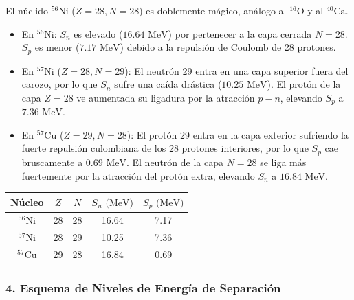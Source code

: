 \begin{problema}
El núclido ${}^{56}\text{Ni}$ ($Z=28, N=28$) es doblemente mágico, análogo al ${}^{16}\text{O}$ y al ${}^{40}\text{Ca}$.
\begin{itemize}
    \item En ${}^{56}\text{Ni}$: $S_n$ es elevado ($16.64\text{ MeV}$) por pertenecer a la capa cerrada $N=28$. $S_p$ es menor ($7.17\text{ MeV}$) debido a la repulsión de Coulomb de 28 protones.
    \item En ${}^{57}\text{Ni}$ ($Z=28, N=29$): El neutrón 29 entra en una capa superior fuera del carozo, por lo que $S_n$ sufre una caída drástica ($10.25\text{ MeV}$). El protón de la capa $Z=28$ ve aumentada su ligadura por la atracción $p-n$, elevando $S_p$ a $7.36\text{ MeV}$.
    \item En ${}^{57}\text{Cu}$ ($Z=29, N=28$): El protón 29 entra en la capa exterior sufriendo la fuerte repulsión culombiana de los 28 protones interiores, por lo que $S_p$ cae bruscamente a $0.69\text{ MeV}$. El neutrón de la capa $N=28$ se liga más fuertemente por la atracción del protón extra, elevando $S_n$ a $16.84\text{ MeV}$.
\end{itemize}

\begin{center}
\begin{tabular}{ccccc}
\hline
Núcleo & $Z$ & $N$ & $S_n\text{ (MeV)}$ & $S_p\text{ (MeV)}$ \\
\hline
${}^{56}\text{Ni}$ & 28 & 28 & 16.64 & 7.17 \\
${}^{57}\text{Ni}$ & 28 & 29 & 10.25 & 7.36 \\
${}^{57}\text{Cu}$ & 29 & 28 & 16.84 & 0.69 \\
\hline
\end{tabular}
\end{center}

\subsubsection*{4. Esquema de Niveles de Energía de Separación}

\begin{center}
\end{center}
\end{problema}
